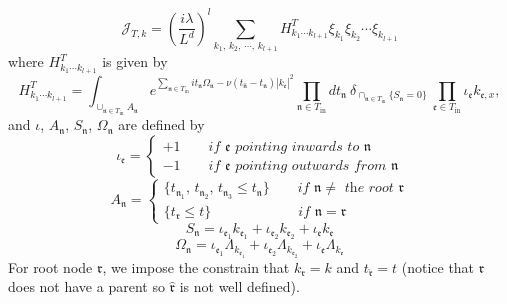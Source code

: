 \begin{lem}
\begin{equation}\label{eq.coefterm}
\mathcal{J}_{T,k}=\left(\frac{i\lambda}{L^{d}}\right)^l\sum_{k_1,\, k_2,\, \cdots,\, k_{l+1}} H^T_{k_1\cdots k_{l+1}}  \xi_{k_1}\xi_{k_2}\cdots\xi_{k_{l+1}}   
\end{equation}
where $H^T_{k_1\cdots k_{l+1}}$ is given by
\begin{equation}\label{eq.coef}
H^T_{k_1\cdots k_{l+1}}=\int_{\cup_{\mathfrak{n}\in T_{\text{in}}} A_{\mathfrak{n}}} e^{\sum_{\mathfrak{n}\in T_{\text{in}}} it_{\mathfrak{n}}\Omega_{\mathfrak{n}}-\nu(t_{\widehat{\mathfrak{n}}}-t_{\mathfrak{n}})|k_{\mathfrak{e}}|^2} \prod_{\mathfrak{n}\in T_{\text{in}}} dt_{\mathfrak{n}} %
\ \delta_{\cap_{\mathfrak{n}\in T_{\text{in}}} \{S_{\mathfrak{n}}=0\}}\ \prod_{\mathfrak{e}\in T_{\text{in}}}\iota_{\mathfrak{e}}k_{\mathfrak{e},x} ,
\end{equation}
and $\iota$, $A_{\mathfrak{n}}$, $S_{\mathfrak{n}}$, $\Omega_{\mathfrak{n}}$ are defined by 
\begin{equation}\label{eq.iotadef}
    \iota_{\mathfrak{e}}=\begin{cases}
        +1 \qquad \textit{if $\mathfrak{e}$ pointing inwards to $\mathfrak{n}$}
        \\
        -1 \qquad  \textit{if $\mathfrak{e}$ pointing outwards from $\mathfrak{n}$}
    \end{cases}
\end{equation}
\begin{equation}
    A_{\mathfrak{n}}=
        \begin{cases}
            \{t_{\mathfrak{n}_1},\, t_{\mathfrak{n}_2},\, t_{\mathfrak{n}_3}\le t_{\mathfrak{n}}\} \qquad \textit{if $\mathfrak{n}\ne$ the root $\mathfrak{r}$}
            \\
            \{t_{\mathfrak{r}}\le t\} \qquad\qquad\qquad\  \textit{if $\mathfrak{n}= \mathfrak{r}$ }
        \end{cases}
\end{equation}
\begin{equation}\label{eq.defnS_n}
    S_{\mathfrak{n}}=\iota_{\mathfrak{e}_1}k_{\mathfrak{e}_1}+\iota_{\mathfrak{e}_2}k_{\mathfrak{e}_2}+\iota_{\mathfrak{e}}k_{\mathfrak{e}}
\end{equation}
\begin{equation}
    \Omega_{\mathfrak{n}}=\iota_{\mathfrak{e}_1}\Lambda_{k_{\mathfrak{e}_1}}+\iota_{\mathfrak{e}_2}\Lambda_{k_{\mathfrak{e}_2}}+\iota_{\mathfrak{e}}\Lambda_{k_{\mathfrak{e}}}
\end{equation}
For root node $\mathfrak{r}$, we impose the constrain that $k_{\mathfrak{r}}=k$ and $t_{\widehat{\mathfrak{r}}}=t$ (notice that $\mathfrak{r}$ does not have a parent so $\widehat{\mathfrak{r}}$ is not well defined). 
\end{lem}

